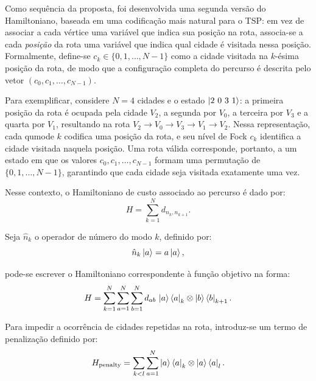 
    Como sequência da proposta, foi desenvolvida uma segunda versão do Hamiltoniano, baseada em uma codificação mais natural para o TSP: em vez de associar a cada vértice uma variável que indica sua posição na rota, associa-se a cada \textit{posição} da rota uma variável que indica qual cidade é visitada nessa posição. Formalmente, define-se $c_k \in \{0, 1, \dots, N-1\}$ como a cidade visitada na $k$-ésima posição da rota, de modo que a configuração completa do percurso é descrita pelo vetor $(c_0, c_1, \dots, c_{N-1})$.

    Para exemplificar, considere $N=4$ cidades e o estado $\ket{2\ 0\ 3\ 1}$: a primeira posição da rota é ocupada pela cidade $V_2$, a segunda por $V_0$, a terceira por $V_3$ e a quarta por $V_1$, resultando na rota $V_2 \rightarrow V_0 \rightarrow V_3 \rightarrow V_1 \rightarrow V_2$. Nessa representação, cada qumode $k$ codifica uma posição da rota, e seu nível de Fock $c_k$ identifica a cidade visitada naquela posição. Uma rota válida corresponde, portanto, a um estado em que os valores $c_0, c_1, \dots, c_{N-1}$ formam uma permutação de $\{0, 1, \dots, N-1\}$, garantindo que cada cidade seja visitada exatamente uma vez.

    Nesse contexto, o Hamiltoniano de custo associado ao percurso é dado por:
    $$
    H = \sum_{k=1}^N d_{n_k, n_{k+1}}.
    $$

    Seja $\hat{n}_k$ o operador de número do modo $k$, definido por:
    $$
    \hat{n}_k\ket{a} = a\ket{a},
    $$

    \noindent pode-se escrever o Hamiltoniano correspondente à função objetivo na forma:
    $$
    H = \sum_{k=1}^N \sum_{a=1}^N \sum_{b=1}^N d_{ab}\, \ket{a}\bra{a}_k \otimes \ket{b}\bra{b}_{k+1}.
    $$

    Para impedir a ocorrência de cidades repetidas na rota, introduz-se um termo de penalização definido por:
    $$
    H_{\text{penalty}} = \sum_{k<l} \sum_{a=1}^N \ket{a}\bra{a}_k \otimes \ket{a}\bra{a}_l.
    $$

